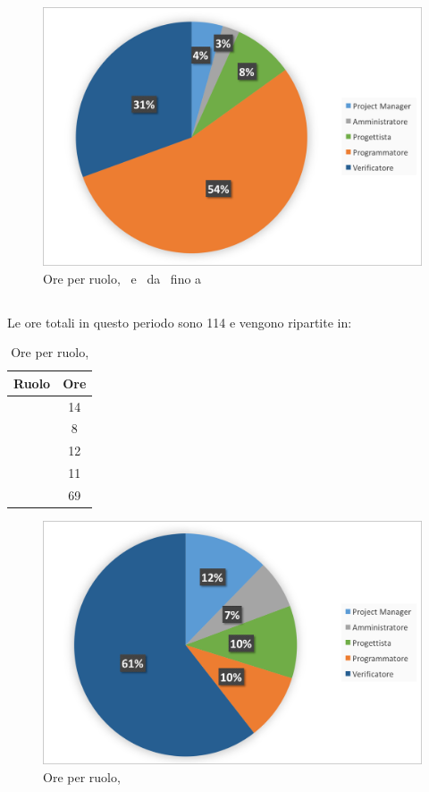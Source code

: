 \begin{figure}[H]
	\centering 
	\includegraphics[scale=0.7]{Immagini/GraficiTorte/COD.png}
	\caption{Ore per ruolo, \PD\ e \COD\ da \RP\ fino a \RQ}
\end{figure}

\newpage
\subsection{\VV}
Le ore totali in questo periodo sono 114 e vengono ripartite in:

\begin{table}[h]
	\begin{center}
		\begin{tabular}{|c|c|}
			\hline
			\textbf{Ruolo}	& \textbf{Ore} \\
			\hline
			\Pm &	14\\
			\hline
			\Am	&	8\\
			\hline
			\Prog		&	12\\
			\hline
			\Progr & 11\\
			\hline
			\Ver	&	69\\
			\hline
		\end{tabular}
	\end{center}
	\caption{Ore per ruolo, \VV}
\end{table}

\begin{figure}[H]
	\centering 
	\includegraphics[scale=0.7]{Immagini/GraficiTorte/VV.png}
	\caption{Ore per ruolo, \VV}
\end{figure}
\newpage
